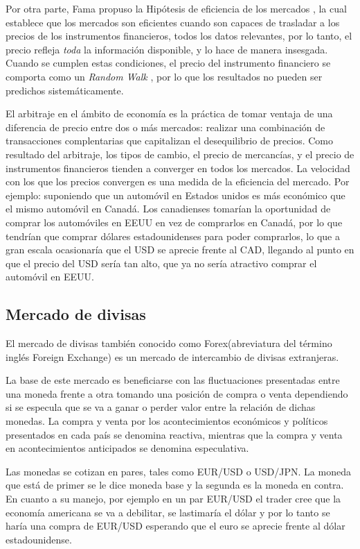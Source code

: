 Por otra parte, Fama propuso la Hipótesis de eficiencia de los mercados
\cite{malkiel2012efficient}, la cual establece que los mercados son eficientes
cuando son capaces de trasladar a los precios de los instrumentos financieros,
todos los datos relevantes, por lo tanto, el precio refleja \emph{toda} la
información disponible, y lo hace de manera insesgada. Cuando se cumplen estas
condiciones, el precio del instrumento financiero se comporta como un
\emph{Random Walk} \cite{fama1965random}, por lo que los resultados no pueden
ser predichos sistemáticamente.

El arbitraje en el ámbito de economía es la práctica de tomar ventaja de una
diferencia de precio entre dos o más mercados: realizar una combinación de
transacciones complentarias que capitalizan el desequilibrio de precios. Como
resultado del arbitraje, los tipos de cambio, el precio de mercancías, y el
precio de instrumentos financieros tienden a converger en todos los mercados.
La velocidad con los que los precios convergen es una medida de la eficiencia
del mercado. Por ejemplo: suponiendo que un automóvil en Estados unidos es más
económico que el mismo automóvil en Canadá. Los canadienses tomarían la
oportunidad de comprar los automóviles en EEUU en vez de comprarlos en Canadá,
por lo que tendrían que comprar dólares estadounidenses para poder comprarlos,
lo que a gran escala ocasionaría que el USD se aprecie frente al CAD, llegando
al punto en que el precio del USD sería tan alto, que ya no sería atractivo
comprar el automóvil en EEUU.

\subsection{Mercado de divisas}
El mercado de divisas también conocido como Forex(abreviatura del término
inglés Foreign Exchange) es un mercado de intercambio de divisas extranjeras.

La base de este mercado es beneficiarse con las fluctuaciones presentadas entre
una moneda frente a otra tomando una posición de compra o venta dependiendo si
se especula que se va a ganar o perder valor entre la relación de dichas
monedas. La compra y venta por los acontecimientos económicos y políticos
presentados en cada país se denomina reactiva, mientras que la compra y venta
en acontecimientos anticipados se denomina especulativa. 

Las monedas se cotizan en pares, tales como EUR/USD o USD/JPN. La moneda que
está de primer se le dice moneda base y la segunda es la moneda en contra. En
cuanto a su manejo, por ejemplo en un par EUR/USD el trader cree que la
economía americana se va a debilitar, se lastimaría el dólar y por lo tanto se
haría una compra de EUR/USD esperando que el euro se aprecie frente al dólar
estadounidense. 

